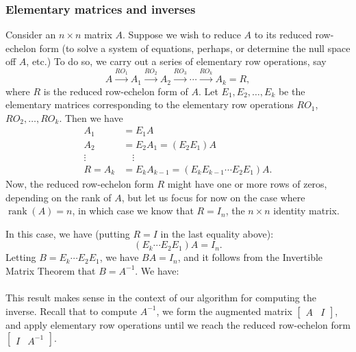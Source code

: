 \subsubsection*{Elementary matrices and inverses}

Consider an $n\times n$ matrix $A$. Suppose we wish to reduce $A$ to its reduced row-echelon form (to solve a system of equations, perhaps, or determine the null space off $A$, etc.) To do so, we carry out a series of elementary row operations, say
\[
A \xrightarrow{RO_1} A_1 \xrightarrow{RO_2} A_2 \xrightarrow{RO_3} \cdots \xrightarrow{RO_k} A_k = R,
\]
where $R$ is the reduced row-echelon form of $A$. Let $E_1, E_2, \ldots, E_k$ be the elementary matrices corresponding to the elementary row operations $RO_1$, $RO_2, \ldots, RO_k$. Then we have
\begin{align*}
 A_1 & = E_1A\\
 A_2 & = E_2A_1 = (E_2E_1)A\\
 \vdots & \quad \vdots\\
 R = A_k & = E_kA_{k-1} = (E_kE_{k-1}\cdots E_2E_1)A.
\end{align*}
Now, the reduced row-echelon form $R$ might have one or more rows of zeros, depending on the rank of $A$, but let us focus for now on the case where $\operatorname{rank}(A)=n$, in which case we know that $R=I_n$, the $n\times n$ identity matrix.

In this case, we have (putting $R=I$ in the last equality above):
\[
(E_k\cdots E_2E_1)A = I_n.
\]
Letting $B=E_k\cdots E_2E_1$, we have $BA=I_n$, and it follows from the Invertible Matrix Theorem that $B=A^{-1}$. We have:\\

\\

This result makes sense in the context of our algorithm for computing the inverse. Recall that to compute $A^{-1}$, we form the augmented matrix $[\begin{array}{c|c}A&I\end{array}]$, and apply elementary row operations until we reach the reduced row-echelon form $[\begin{array}{c|c} I&A^{-1}\end{array}]$. 

